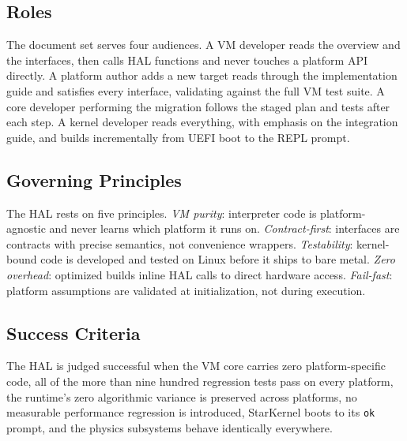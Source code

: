 \subsection{Roles}

The document set serves four audiences. A VM developer reads the overview and
the interfaces, then calls HAL functions and never touches a platform API
directly. A platform author adds a new target reads through the implementation
guide and satisfies every interface, validating against the full VM test suite.
A core developer performing the migration follows the staged plan and tests
after each step. A kernel developer reads everything, with emphasis on the
integration guide, and builds incrementally from UEFI boot to the REPL prompt.

\subsection{Governing Principles}

The HAL rests on five principles. \emph{VM purity}: interpreter code is
platform-agnostic and never learns which platform it runs on. \emph{Contract-first}:
interfaces are contracts with precise semantics, not convenience wrappers.
\emph{Testability}: kernel-bound code is developed and tested on Linux before it
ships to bare metal. \emph{Zero overhead}: optimized builds inline HAL calls to
direct hardware access. \emph{Fail-fast}: platform assumptions are validated at
initialization, not during execution.

\subsection{Success Criteria}

The HAL is judged successful when the VM core carries zero platform-specific
code, all of the more than nine hundred regression tests pass on every
platform, the runtime's zero algorithmic variance is preserved across
platforms, no measurable performance regression is introduced, StarKernel boots
to its \texttt{ok} prompt, and the physics subsystems behave identically
everywhere.

